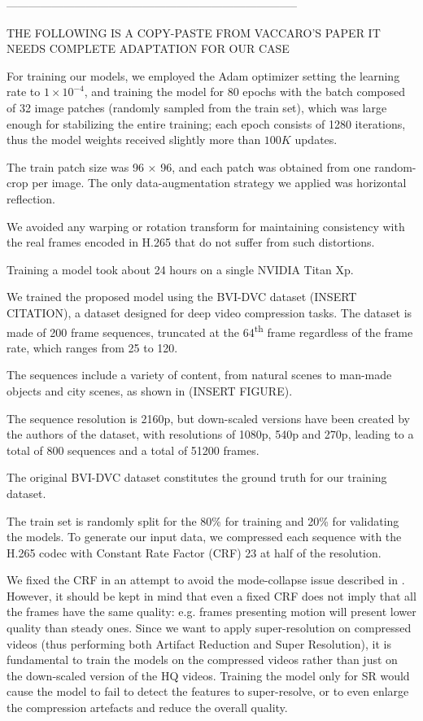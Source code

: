 -----------------------------------------------------------------------------

THE FOLLOWING IS A COPY-PASTE FROM VACCARO'S PAPER
IT NEEDS COMPLETE ADAPTATION FOR OUR CASE

For training our models, we employed the Adam optimizer setting the learning rate to $1\times10^{-4}$, and training the model for 80 epochs with the batch composed of 32 image patches (randomly sampled from the train set), which was large enough for stabilizing the entire training; each epoch consists of 1280 iterations, thus the model weights received slightly more than $100K$ updates.

The train patch size was 96 × 96, and each patch was obtained from one random-crop per image.
The only data-augmentation strategy we applied was horizontal reflection.

We avoided any warping or rotation transform for maintaining consistency with the real frames encoded in H.265 that do not suffer from such distortions.

Training a model took about 24 hours on a single NVIDIA Titan Xp.

We trained the proposed model using the BVI-DVC dataset (INSERT CITATION), a dataset designed for deep video compression tasks. The dataset is made of 200 frame sequences, truncated at the 64\textsuperscript{th} frame regardless of the frame rate, which ranges from 25 to 120.

The sequences include a variety of content, from natural scenes to man-made objects and
city scenes, as shown in (INSERT FIGURE).

The sequence resolution is 2160p, but down-scaled versions have been created by the authors of the dataset, with resolutions of 1080p, 540p and 270p, leading to a total of 800 sequences and a total of 51200 frames.

The original BVI-DVC dataset constitutes the ground truth for our training dataset.

The train set is randomly split for the 80\% for training and 20\% for validating the models.
To generate our input data, we compressed each sequence with the H.265 codec with Constant Rate Factor (CRF) 23 at half of the resolution.

We fixed the CRF in an attempt to avoid the mode-collapse issue described in \cite{galteri2019deep}. However, it should be kept in mind that even a fixed CRF does not imply that all the frames have the same quality: e.g. frames presenting motion will present lower quality than steady ones.
Since we want to apply super-resolution on compressed videos (thus performing both Artifact Reduction and Super Resolution), it is fundamental to train the models on the compressed videos rather than just on the down-scaled version of the HQ videos. Training the model only for SR would cause the model to fail to detect the features to super-resolve, or to even enlarge the compression artefacts and reduce the overall quality.

